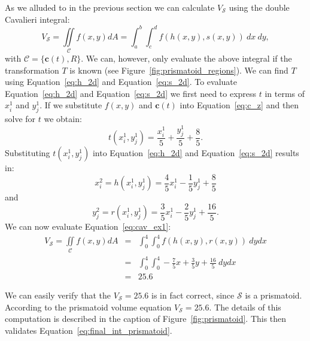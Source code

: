 \documentclass{article}
\theoremstyle{theorem}
\theoremstyle{definition}
\begin{document}
\noindent
As we alluded to in the previous section we can calculate $V_{\mathcal{S}}$ using the double Cavalieri integral:
\begin{equation}
\label{eq:cav_ex1}
V_{\mathcal{S}} = \iint\limits_{\!\mathcal{C}} f(x,y) dA =  \int_a^b\int_c^d f(h(x,y),s(x,y))~dx~dy,
\end{equation}
with $\mathcal{C}=\{\mathbf{c}(t),R\}$. We can, however, only evaluate the above integral if the transformation $T$ is known (see Figure~\ref{fig:prismatoid_regions}). We can find $T$ using Equation~\eqref{eq:h_2d} and 
Equation~\eqref{eq:s_2d}. To evaluate Equation~\eqref{eq:h_2d} and Equation~\eqref{eq:s_2d} we first need to express $t$ in terms of $x_i^1$ and $y_j^1$. If we substitute $f(x,y)$ and $\mathbf{c}(t)$ into Equation~\eqref{eq:c_z} and then solve for $t$ we obtain:
\begin{equation}
t(x_i^1,y_j^1) = \frac{x_i^1}{5} + \frac{y_j^1}{5} + \frac{8}{5}. 
\end{equation}
Substituting $t(x_i^1,y_j^1)$ into Equation~\eqref{eq:h_2d} and Equation~\eqref{eq:s_2d} results in:
\begin{equation}
x_{i}^2 = h(x_{i}^1,y_{j}^1) = \frac{4}{5} x_{i}^1 - \frac{1}{5} y_{j}^1 + \frac{8}{5}  
\end{equation}
and
\begin{equation}
y_{j}^2 = r(x_{i}^1,y_{j}^1) = \frac{3}{5} x_{i}^1 - \frac{2}{5} y_{j}^1 + \frac{16}{5}.  
\end{equation}
We can now evaluate Equation~\eqref{eq:cav_ex1}:
\begin{eqnarray}
\label{eq:final_int_prismatoid}
V_{\mathcal{S}}=\iint\limits_{\!\mathcal{C}} f(x,y) dA &=& \int_0^4\int_0^4 f(h(x,y),r(x,y))~dydx\\
&=& \int_0^4 \int_0^4 -\frac{7}{5}x + \frac{3}{5} y + \frac{16}{5}~dydx\\
&=& 25.6
\end{eqnarray}

\noindent
We can easily verify that the $V_{\mathcal{S}} = 25.6$ is in fact correct, since $\mathcal{S}$ is a prismatoid. According to the prismatoid volume 
equation $V_{\mathcal{S}}=25.6$. The details of this computation is described in the caption of Figure~\ref{fig:prismatoid}. This then validates Equation~\ref{eq:final_int_prismatoid}.
\end{document}
